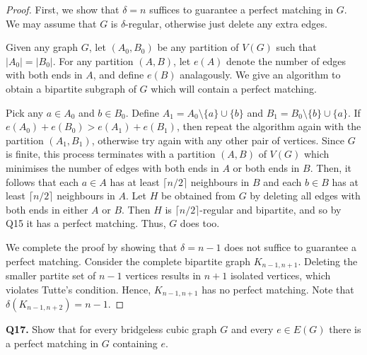 \begin{proof}
First, we show that \( \delta = n \) suffices to guarantee a perfect matching in \( G \). We may assume that \( G \) is \( \delta  \)-regular, otherwise just delete any extra edges.

Given any graph \( G \), let \( (A_0,B_0) \) be any partition of \( V(G) \) such that \( |A_0| = |B_0| \). For any partition \( (A,B) \), let \( e(A) \) denote the number of edges with both ends in \( A \), and define \( e(B) \) analagously. We give an algorithm to obtain a bipartite subgraph of \( G \) which will contain a perfect matching.

Pick any \( a \in A_0 \) and \( b \in B_0 \). Define \( A_1 = A_0 \setminus \{ a \} \cup \{ b \}  \) and \( B_1 = B_0 \setminus \{ b \} \cup \{ a \}  \). If \( e(A_0) + e(B_0) > e(A_1) + e(B_1) \), then repeat the algorithm again with the partition \( (A_1, B_1) \), otherwise try again with any other pair of vertices. Since \( G \) is finite, this process terminates with a partition \( (A,B) \) of \( V(G) \) which minimises the number of edges with both ends in \( A \) or both ends in \( B \). Then, it follows that each \( a \in A \) has at least \( \lceil n / 2 \rceil \) neighbours in \( B \) and each \( b \in B \) has at least \( \lceil n / 2 \rceil \) neighbours in \( A \). Let \( H \) be obtained from \( G \) by deleting all edges with both ends in either \( A \) or \( B \). Then \( H \) is \( \lceil n/2 \rceil \)-regular and bipartite, and so by Q15 it has a perfect matching. Thus, \( G \) does too.

We complete the proof by showing that \( \delta = n - 1 \) does not suffice to guarantee a perfect matching. Consider the complete bipartite graph \( K_{n-1, n+1}  \). Deleting the smaller partite set of \( n - 1 \) vertices results in \( n + 1 \) isolated vertices, which violates Tutte's condition. Hence, \( K_{n-1, n+1}  \) has no perfect matching. Note that \( \delta (K_{n-1, n+2}) = n - 1 \).
\end{proof}
\noindent \textbf{Q17.} Show that for every bridgeless cubic graph \( G \) and every \( e \in E(G) \) there is a perfect matching in \( G \) containing \( e \).
